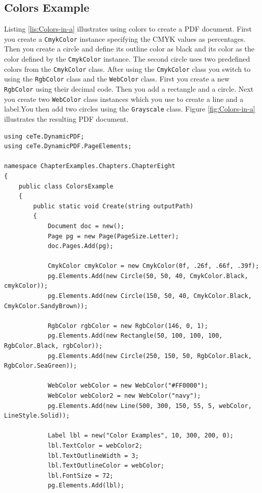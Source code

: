 \documentclass[american]{tufte-book}
\numberwithin{equation}{section}
\numberwithin{figure}{section}
\begin{document}
{\subsection{Colors Example}

Listing \ref{lis:Colors-in-a} illustrates using colors to create
a PDF document. First you create a \texttt{CmykColor} instance specifying the
CMYK values as percentages. Then you create a circle and define its
outline color as black and its color as the color defined by the \texttt{CmykColor}
instance. The second circle uses two predefined colors from the \texttt{CmykColor}
class. After using the \texttt{CmykColor} class you switch to using the \texttt{RgbColor}
class and the \texttt{WebColor} class. First you create a new \texttt{RgbColor} using
their decimal code. Then you add a rectangle and a circle. Next you
create two \texttt{WebColor} class instances which you use to create a line
and a label.You then add two circles using the \texttt{Grayscale} class. Figure
\ref{fig:Colors-in-a} illustrates the resulting PDF document.

\bgroup{}
\begin{lstlisting}[caption={Colors in a PDF document.},label={lis:Colors-in-a},basicstyle={\footnotesize\ttfamily},breaklines=true]
using ceTe.DynamicPDF;
using ceTe.DynamicPDF.PageElements;

namespace ChapterExamples.Chapters.ChapterEight
{
    public class ColorsExample
    {
        public static void Create(string outputPath)
        {
            Document doc = new();
            Page pg = new Page(PageSize.Letter);
            doc.Pages.Add(pg);

            CmykColor cmykColor = new CmykColor(0f, .26f, .66f, .39f);
            pg.Elements.Add(new Circle(50, 50, 40, CmykColor.Black, cmykColor));
            pg.Elements.Add(new Circle(150, 50, 40, CmykColor.Black, CmykColor.SandyBrown));

            RgbColor rgbColor = new RgbColor(146, 0, 1);
            pg.Elements.Add(new Rectangle(50, 100, 100, 100, RgbColor.Black, rgbColor));
            pg.Elements.Add(new Circle(250, 150, 50, RgbColor.Black, RgbColor.SeaGreen));
            
            WebColor webColor = new WebColor("#FF0000");
            WebColor webColor2 = new WebColor("navy");
            pg.Elements.Add(new Line(500, 300, 150, 55, 5, webColor, LineStyle.Solid));

            Label lbl = new("Color Examples", 10, 300, 200, 0);
            lbl.TextColor = webColor2;
            lbl.TextOutlineWidth = 3;
            lbl.TextOutlineColor = webColor;
            lbl.FontSize = 72;
            pg.Elements.Add(lbl);


\end{lstlisting}}
\end{document}
